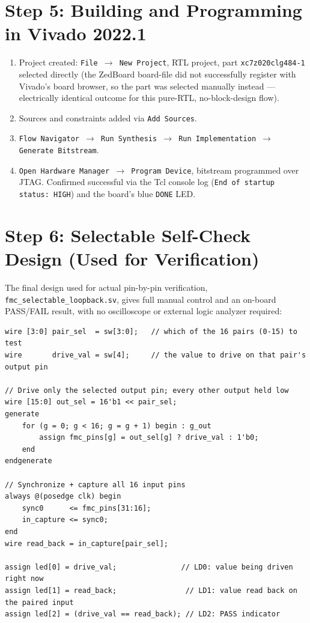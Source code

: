 \documentclass[11pt]{article}
\begin{document}
\section{Step 5: Building and Programming in Vivado 2022.1}

\begin{enumerate}
    \item Project created: \texttt{File $\to$ New Project}, RTL project, part
    \texttt{xc7z020clg484-1} selected directly (the ZedBoard board-file did not
    successfully register with Vivado's board browser, so the part was selected manually
    instead --- electrically identical outcome for this pure-RTL, no-block-design flow).
    \item Sources and constraints added via \texttt{Add Sources}.
    \item \texttt{Flow Navigator $\to$ Run Synthesis $\to$ Run Implementation $\to$
    Generate Bitstream}.
    \item \texttt{Open Hardware Manager $\to$ Program Device}, bitstream programmed over
    JTAG. Confirmed successful via the Tcl console log (\texttt{End of startup status:
    HIGH}) and the board's blue \texttt{DONE} LED.
\end{enumerate}

\section{Step 6: Selectable Self-Check Design (Used for Verification)}
\label{sec:selfcheck}

The final design used for actual pin-by-pin verification,
\texttt{fmc\_selectable\_loopback.sv}, gives full manual control and an on-board
PASS/FAIL result, with no oscilloscope or external logic analyzer required:

\begin{lstlisting}[caption={Core logic of fmc\_selectable\_loopback.sv}]
wire [3:0] pair_sel  = sw[3:0];   // which of the 16 pairs (0-15) to test
wire       drive_val = sw[4];     // the value to drive on that pair's output pin

// Drive only the selected output pin; every other output held low
wire [15:0] out_sel = 16'b1 << pair_sel;
generate
    for (g = 0; g < 16; g = g + 1) begin : g_out
        assign fmc_pins[g] = out_sel[g] ? drive_val : 1'b0;
    end
endgenerate

// Synchronize + capture all 16 input pins
always @(posedge clk) begin
    sync0      <= fmc_pins[31:16];
    in_capture <= sync0;
end
wire read_back = in_capture[pair_sel];

assign led[0] = drive_val;               // LD0: value being driven right now
assign led[1] = read_back;                // LD1: value read back on the paired input
assign led[2] = (drive_val == read_back); // LD2: PASS indicator
\end{lstlisting}
\end{document}
